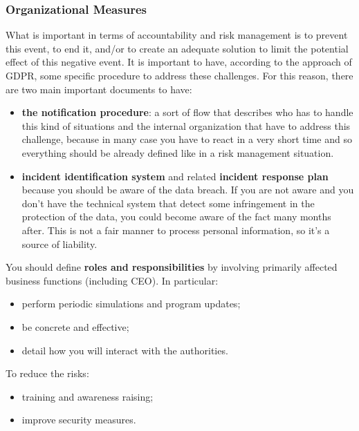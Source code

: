 \subsubsection{Organizational Measures}
What is important in terms of accountability and risk management is to prevent this event, to end it, and/or to create an adequate solution to limit the potential effect of this negative event. It is important to have, according to the approach of GDPR, some specific procedure to address these challenges. For this reason, there are two main important documents to have:
\begin{itemize}
    \item \textbf{the notification procedure}: a sort of flow that describes who has to handle this kind of situations and the internal organization that have to address this challenge, because in many case you have to react in a very short time and so everything should be already defined like in a risk management situation.
    \item \textbf{incident identification system} and related \textbf{incident response plan} because you should be aware of the data breach. If you are not aware and you don’t have the technical system that detect some infringement in the protection of the data, you could become aware of the fact many months after. This is not a fair manner to process personal information, so it’s a source of liability.
\end{itemize}
You should define \textbf{roles and responsibilities} by involving primarily affected business functions (including CEO). In particular:
\begin{itemize}
    \item perform periodic simulations and program updates;
    \item be concrete and effective;
    \item detail how you will interact with the authorities.
\end{itemize}

To reduce the risks:
\begin{itemize}
    \item training and awareness raising;
    \item improve security measures.
\end{itemize}


